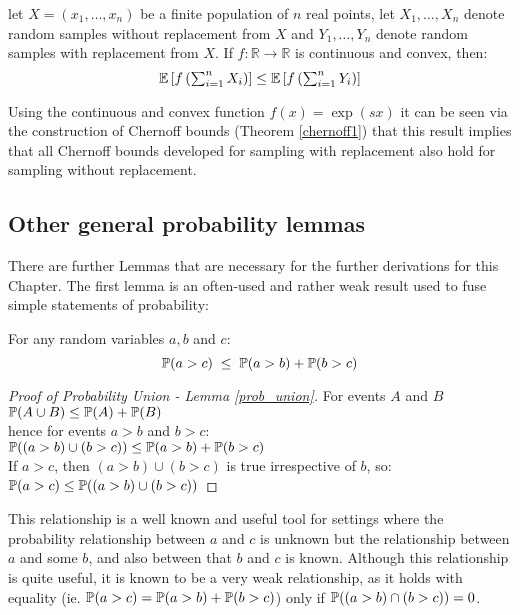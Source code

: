 \begin{lemma}\label{hoeffdings_reduction}
let $X=(x_1,\dots,x_n)$ be a finite population of $n$ real points, let $X_1,\dots,X_n$ denote random samples without replacement from $X$ and $Y_1,\dots,Y_n$ denote random samples with replacement from $X$. 
If $f:\mathbb{R}\rightarrow\mathbb{R}$ is continuous and convex, then:
$$\textstyle \operatorname{\mathbb{E}}\left[f\left(\sum_{i=1}^nX_i\right)\right]\le\operatorname{\mathbb{E}}\left[f\left(\sum_{i=1}^nY_i\right)\right] $$
\end{lemma}

Using the continuous and convex function $f(x)=\exp(sx)$ it can be seen via the construction of Chernoff bounds (Theorem \ref{chernoff1}) that this result implies that all Chernoff bounds developed for sampling with replacement also hold for sampling without replacement.



\subsection{Other general probability lemmas}

There are further Lemmas that are necessary for the further derivations for this Chapter.
The first lemma is an often-used and rather weak result used to fuse simple statements of probability:
\begin{lemma}\label{prob_union}
For any random variables $a,b$ and $c$:
\[\operatorname{\mathbb{P}}(a>c) \; \le \; \operatorname{\mathbb{P}}(a>b) + \operatorname{\mathbb{P}}(b>c)\]
\end{lemma}
\begin{proof}[Proof of Probability Union - Lemma \ref{prob_union}]
For events $A$ and $B$\\$\operatorname{\mathbb{P}}(A\cup B) \le \operatorname{\mathbb{P}}(A)+\operatorname{\mathbb{P}}(B)$\\
hence for events $a>b$ and $b>c$:\\ $\operatorname{\mathbb{P}}((a>b) \cup (b>c)) \le \operatorname{\mathbb{P}}(a>b) + \operatorname{\mathbb{P}}(b>c)$\\
If $a>c$, then $(a>b) \cup (b>c)$ is true irrespective of $b$, so:\\
$\operatorname{\mathbb{P}}(a>c) \le \operatorname{\mathbb{P}}((a>b) \cup (b>c))$
\end{proof}
This relationship is a well known and useful tool for settings where the probability relationship between $a$ and $c$ is unknown but the relationship between $a$ and some $b$, and also between that $b$ and $c$ is known.
Although this relationship is quite useful, it is known to be a very weak relationship, as it holds with equality (ie. $\operatorname{\mathbb{P}}(a>c)=\operatorname{\mathbb{P}}(a>b)+\operatorname{\mathbb{P}}(b>c)$) only if $\operatorname{\mathbb{P}}((a>b)\cap(b>c))=0$.

